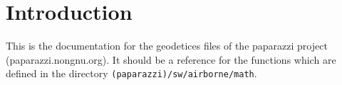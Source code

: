 \section{Introduction}
This is the documentation for the geodetices files of the paparazzi project (paparazzi.nongnu.org). It should be a reference for the functions which are defined in the directory \texttt{(paparazzi)/sw/airborne/math}.


